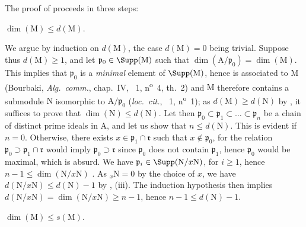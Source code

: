 The proof of  proceeds in three steps:

\begin{env}[16.2.3.2]
\label{0.16.2.3.2}
$\dim(\mathrm{M})\leq d(\mathrm{M})$.
\end{env}

We argue by induction on $d(\mathrm{M})$, the case $d(\mathrm{M})=0$ being trivial.
Suppose thus $d(\mathrm{M})\geq 1$, and let $\mathfrak{p}_0\in\Supp(\mathrm{M})$ such that $\dim(\mathrm{A}/\mathfrak{p}_0)=\dim(\mathrm{M})$.
This implies that $\mathfrak{p}_0$ is a \emph{minimal} element of $\Supp(\mathrm{M})$, hence is associated to $\mathrm{M}$ (Bourbaki, \emph{Alg.~comm.}, chap.~IV, \textsection~1, n\textsuperscript{o}~4, th.~2) and $\mathrm{M}$ therefore contains a submodule $\mathrm{N}$ isomorphic to $\mathrm{A}/\mathfrak{p}_0$ (\emph{loc.~cit.}, \textsection~1, n\textsuperscript{o}~1); as $d(\mathrm{M})\geq d(\mathrm{N})$ by , it suffices to prove that $\dim(\mathrm{N})\leq d(\mathrm{N})$.
Let then $\mathfrak{p}_0\subset\mathfrak{p}_1\subset\ldots\subset\mathfrak{p}_n$ be a chain of distinct prime ideals in $\mathrm{A}$, and let us show that $n\leq d(\mathrm{N})$.
This is evident if $n=0$.
Otherwise, there exists $x\in\mathfrak{p}_1\cap\mathfrak{r}$ such that $x\notin\mathfrak{p}_0$, for the relation $\mathfrak{p}_0\supset\mathfrak{p}_1\cap\mathfrak{r}$ would imply $\mathfrak{p}_0\supset\mathfrak{r}$ since $\mathfrak{p}_0$ does not contain $\mathfrak{p}_1$, hence $\mathfrak{p}_0$ would be maximal, which is absurd.
We have $\mathfrak{p}_i\in\Supp(\mathrm{N}/x\mathrm{N})$, for $i\geq 1$, hence $n-1\leq\dim(\mathrm{N}/x\mathrm{N})$ .
As ${}_x\mathrm{N}=0$ by the choice of $x$, we have $d(\mathrm{N}/x\mathrm{N})\leq d(\mathrm{N})-1$ by , (iii).
The induction hypothesis then implies $d(\mathrm{N}/x\mathrm{N})=\dim(\mathrm{N}/x\mathrm{N})\geq n-1$, hence $n-1\leq d(\mathrm{N})-1$.


\begin{env}[16.2.3.3]
\label{0.16.2.3.3}
$\dim(\mathrm{M})\leq s(\mathrm{M})$.
\end{env}

